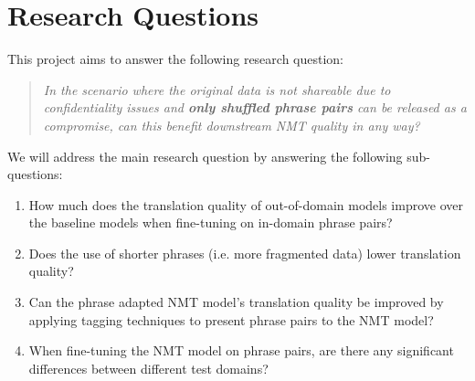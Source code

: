 \section{Research Questions}\label{section:research_questions}

This project aims to answer the following research question:

\begin{quote}

\textit{In the scenario where the original data is not shareable due to confidentiality issues and \textbf{only shuffled phrase pairs} can be released as a compromise, can this benefit downstream NMT quality in any way?}

\end{quote}

\noindent We will address the main research question by answering the following sub-questions:

\begin{enumerate}
    \item How much does the translation quality of out-of-domain models improve over the baseline models when fine-tuning on in-domain phrase pairs?

    \item %
    Does the use of shorter phrases (i.e. more fragmented data) lower translation quality?
    
    \item Can the phrase adapted NMT model's translation quality be improved by applying tagging techniques to present phrase pairs to the NMT model?
    
    \item When fine-tuning the NMT model on phrase pairs, are there any significant differences between different test domains?
    
    
\end{enumerate}

